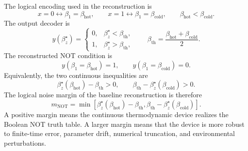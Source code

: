 \documentclass[11pt]{article}
\begin{document}
The logical encoding used in the reconstruction is
\begin{equation}
    x=0 \leftrightarrow \beta_1=\beta_{\mathrm{hot}},
    \qquad
    x=1 \leftrightarrow \beta_1=\beta_{\mathrm{cold}},
    \qquad
    \beta_{\mathrm{hot}}<\beta_{\mathrm{cold}} .
\end{equation}
The output decoder is
\begin{equation}
    y(\beta_z^\star)
    =
    \begin{cases}
    0, & \beta_z^\star<\beta_{\mathrm{th}},\\
    1, & \beta_z^\star>\beta_{\mathrm{th}},
    \end{cases}
    \qquad
    \beta_{\mathrm{th}}
    =
    \frac{\beta_{\mathrm{hot}}+\beta_{\mathrm{cold}}}{2}.
\end{equation}
The reconstructed NOT condition is
\begin{equation}
    y(\beta_1=\beta_{\mathrm{hot}})=1,
    \qquad
    y(\beta_1=\beta_{\mathrm{cold}})=0 .
\end{equation}
Equivalently, the two continuous inequalities are
\begin{equation}
    \beta_z^\star(\beta_{\mathrm{hot}})-\beta_{\mathrm{th}}>0,
    \qquad
    \beta_{\mathrm{th}}-\beta_z^\star(\beta_{\mathrm{cold}})>0 .
\end{equation}
The logical noise margin of the baseline reconstruction is therefore
\begin{equation}
    m_{\mathrm{NOT}}
    =
    \min\left[
        \beta_z^\star(\beta_{\mathrm{hot}})-\beta_{\mathrm{th}},
        \beta_{\mathrm{th}}-\beta_z^\star(\beta_{\mathrm{cold}})
    \right].
\end{equation}
A positive margin means the continuous thermodynamic device realizes the Boolean NOT
truth table.  A larger margin means that the device is more robust to finite-time error,
parameter drift, numerical truncation, and environmental perturbations.
\end{document}
